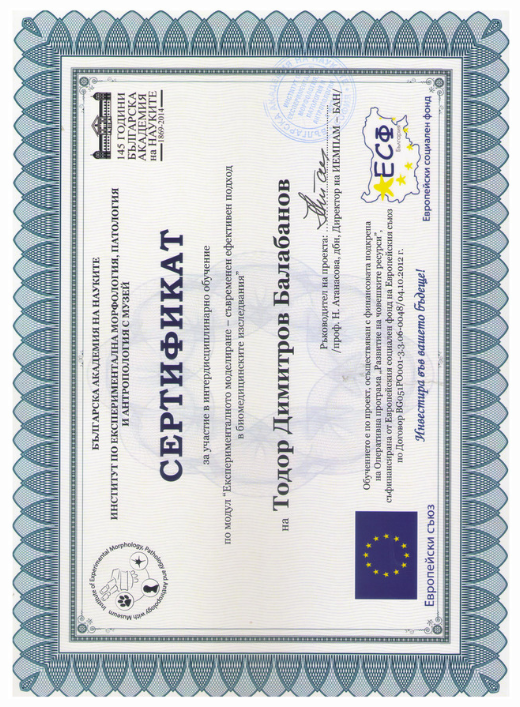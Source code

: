 \documentclass[bulgarian,a4paper]{europasscv}
\begin{document}
\includegraphics[width=\textwidth,height=\textheight,keepaspectratio]{IEMPAM2014_3}
\end{document}

